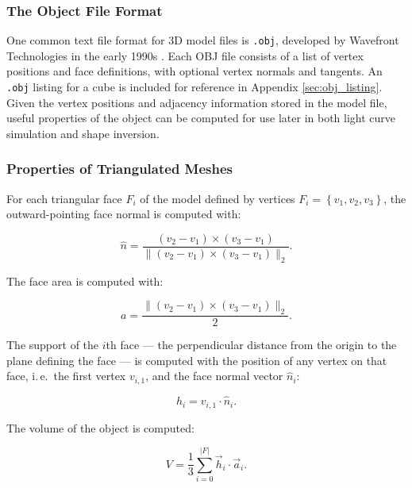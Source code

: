 \subsubsection{The Object File Format}

One common text file format for 3D model files is \texttt{.obj}, developed by Wavefront Technologies in the early 1990s \cite{obj_format}. Each OBJ file consists of a list of vertex positions and face definitions, with optional vertex normals and tangents. An \texttt{.obj} listing for a cube is included for reference in Appendix \ref{sec:obj_listing}. Given the vertex positions and adjacency information stored in the model file, useful properties of the object can be computed for use later in both light curve simulation and shape inversion. 

\subsubsection{Properties of Triangulated Meshes}

For each triangular face $F_i$ of the model defined by vertices $F_i = \left\{v_1, v_2, v_3\right\}$, the outward-pointing face normal is computed with:

\begin{equation} \label{eq:face_normal}
    \hat{n} = \frac{\left( v_2 - v_1 \right) \times \left( v_3 - v_1 \right)}{\| \left( v_2 - v_1 \right) \times \left( v_3 - v_1 \right) \|_2}.
\end{equation}

The face area is computed with:

\begin{equation} \label{eq:face_areas}
    a = \frac{\| \left( v_2 - v_1 \right) \times \left( v_3 - v_1 \right)\|_2}{2}.
\end{equation}

The support of the $i$th face --- the perpendicular distance from the origin to the plane defining the face --- is computed with the position of any vertex on that face, i.\,e.\, the first vertex $v_{i,1}$, and the face normal vector $\hat{n}_i$:

\begin{equation} \label{eq:face_support}
    h_i = v_{i,1} \cdot \hat{n}_i.
\end{equation}

The volume of the object is computed:

\begin{equation} \label{eq:object_volume}
    V = \frac{1}{3} \sum_{i=0}^{ \lvert F \rvert}\vec{h}_i \cdot \vec{a}_i.
\end{equation}

